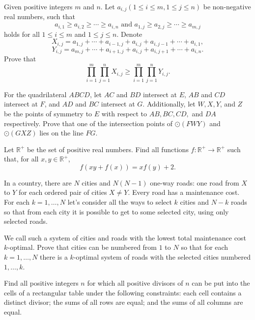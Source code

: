 \documentclass[11pt]{scrartcl}
\begin{document}
\begin{problem}[429524065551462]
	Given positive integers $m$ and $n$. Let $a_{i,j} ( 1 \le i \le m, 1 \le j \le n)$ be non-negative real numbers, such that
$$ a_{i,1} \ge a_{i,2} \ge \cdots \ge a_{i,n} \text{ and } a_{1,j} \ge a_{2,j} \ge \cdots \ge a_{m,j} $$holds for all $1 \le i \le m$ and $1 \le j \le n$. Denote
$$ X_{i,j}=a_{1,j}+\cdots+a_{i-1,j}+a_{i,j}+a_{i,j-1}+\cdots+a_{i,1},$$$$ Y_{i,j}=a_{m,j}+\cdots+a_{i+1,j}+a_{i,j}+a_{i,j+1}+\cdots+a_{i,n}.$$Prove that
$$ \prod_{i=1}^{m} \prod_{j=1}^{n} X_{i,j} \ge \prod_{i=1}^{m} \prod_{j=1}^{n} Y_{i,j}.$$
\end{problem}
\begin{problem}[436681276656848]
For the quadrilateral $ABCD$, let $AC$ and $BD$ intersect at $E$, $AB$ and $CD$ intersect at $F$, and $AD$ and $BC$ intersect at $G$. Additionally, let $W, X, Y$, and $Z$ be the points of symmetry to $E$ with respect to $AB, BC, CD,$ and $DA$ respectively. Prove that one of the intersection points of $\odot(FWY)$ and $\odot(GXZ)$ lies on the line $FG$.
\end{problem}
\begin{problem}[437645166165639]
Let $\mathbb{R}^+$ be the set of positive real numbers. Find all functions $f \colon \mathbb{R}^+ \to \mathbb{R}^+$ such that, for all $x,y \in \mathbb{R}^+$,
$$f(xy+f(x))=xf(y)+2.$$
\end{problem}
\begin{problem}[437956241529021]
	In a country, there are ${}N{}$ cities and $N(N-1)$ one-way roads: one road from $X{}$ to $Y{}$ for each ordered pair of cities $X \neq Y$. Every road has a maintenance cost. For each $k = 1,\ldots, N$ let's consider all the ways to select $k{}$ cities and $N - k{}$ roads so that from each city it is possible to get to some selected city, using only selected roads.

We call such a system of cities and roads with the lowest total maintenance cost $k{}$-optimal. Prove that cities can be numbered from $1{}$ to $N{}$ so that for each $k = 1,\ldots, N$ there is a $k{}$-optimal system of roads with the selected cities numbered $1,\ldots, k$.
\end{problem}
\begin{problem}[441177656992348]
	Find all positive integers $n$ for which all positive divisors of $n$ can be put into the cells of a rectangular table under the following constraints:
each cell contains a distinct divisor;
the sums of all rows are equal; and
the sums of all columns are equal.
\end{problem}
\end{document}
